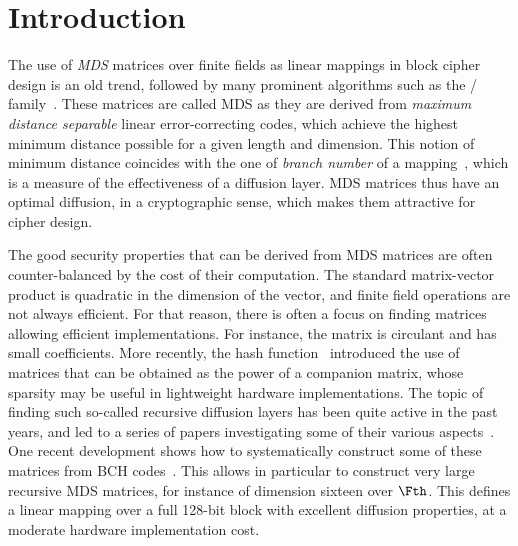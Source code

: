 \section{Introduction}

The use of \emph{MDS} matrices over finite fields as linear mappings in block cipher design is an old trend, followed by many prominent algorithms such as the \AES/\rijndael{} family~\cite{aes}.
These matrices are called MDS as they are derived from \emph{maximum distance separable} linear error-correcting codes, which achieve the highest minimum distance possible
for a given length and dimension. This notion of minimum distance coincides with the one of \emph{branch number} of a mapping~\cite{aes}, which is a measure of the effectiveness
of a diffusion layer.
MDS matrices thus have an optimal diffusion, in a cryptographic sense, which makes them attractive for cipher design.

The good security properties that can be derived from MDS matrices are often counter-balanced by the cost of their computation. The standard matrix-vector product is
quadratic in the dimension of the vector, and finite field operations are not always efficient.
For that reason, there is often a focus on finding matrices allowing efficient implementations. For instance, the \AES{} matrix is circulant and has small coefficients.
More recently, the \photon{} hash function~\cite{photon} introduced the use of matrices that can be obtained as the power of a companion matrix, whose sparsity may be useful in
lightweight hardware implementations. The topic of finding such so-called recursive diffusion layers has been quite active in the past years, and led to a series
of papers investigating some of their various aspects~\cite{recursive1,recursive2,recursive3}. One recent development shows how to systematically construct some of these matrices
from BCH codes~\cite{recursive4}. This allows in particular to construct very large recursive MDS matrices, for instance of dimension sixteen over $\Fth$. This defines a linear mapping over
a full 128-bit block with excellent diffusion properties, at a moderate hardware implementation cost.

